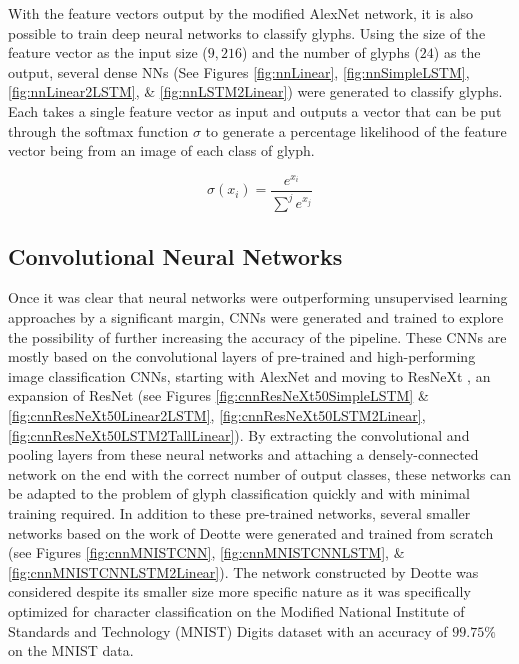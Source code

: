 With the feature vectors output by the modified AlexNet network, it is also possible to train deep neural networks to classify glyphs. Using the size of the feature vector as the input size ($9,216$) and the number of glyphs ($24$) as the output, several dense NNs (See Figures \ref{fig:nnLinear}, \ref{fig:nnSimpleLSTM}, \ref{fig:nnLinear2LSTM}, \& \ref{fig:nnLSTM2Linear}) were generated to classify glyphs. Each takes a single feature vector as input and outputs a vector that can be put through the softmax function $\sigma$  to generate a percentage likelihood of the feature vector being from an image of each class of glyph.

\begin{equation}
  \label{eq:softmax}
  \sigma(x_i)=\frac{e^{x_i}}{\sum^j{e^{x_j}}}
\end{equation}

\subsection{Convolutional Neural Networks}
Once it was clear that neural networks were outperforming unsupervised learning approaches by a significant margin, CNNs were generated and trained to explore the possibility of further increasing the accuracy of the pipeline.
These CNNs are mostly based on the convolutional layers of pre-trained and high-performing image classification CNNs, starting with AlexNet \cite{Krizhevsky}  and moving to ResNeXt \cite{Xie}, an expansion of ResNet \cite{He} (see Figures \ref{fig:cnnResNeXt50SimpleLSTM} \& \ref{fig:cnnResNeXt50Linear2LSTM}, \ref{fig:cnnResNeXt50LSTM2Linear}, \ref{fig:cnnResNeXt50LSTM2TallLinear}). By extracting the convolutional and pooling layers from these neural networks and attaching a densely-connected network on the end with the correct number of output classes, these networks can be adapted to the problem of glyph classification quickly and with minimal training required. In addition to these pre-trained networks, several smaller networks based on the work of Deotte \cite{Deotte} were generated and trained from scratch (see Figures \ref{fig:cnnMNISTCNN}, \ref{fig:cnnMNISTCNNLSTM}, \& \ref{fig:cnnMNISTCNNLSTM2Linear}). The network constructed by Deotte was considered despite its smaller size more specific nature as it was specifically optimized for character classification on the Modified National Institute of Standards and Technology (MNIST) Digits dataset \cite{Deng} with an accuracy of $99.75\%$ on the MNIST data.

